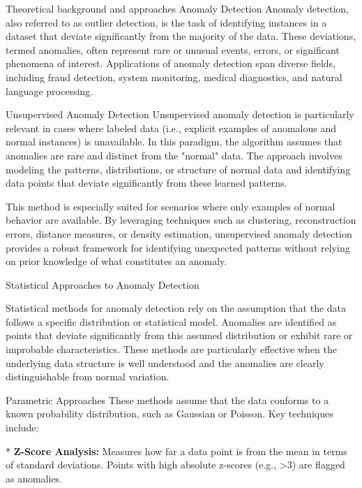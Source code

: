 \chap Theoretical background and approaches
\sec Anomaly Detection
Anomaly detection, also referred to as outlier detection, is the task of identifying instances in a dataset that deviate significantly from the majority of the data. These deviations, termed anomalies, often represent rare or unusual events, errors, or significant phenomena of interest. Applications of anomaly detection span diverse fields, including fraud detection, system monitoring, medical diagnostics, and natural language processing.

\secc Unsupervised Anomaly Detection
Unsupervised anomaly detection is particularly relevant in cases where labeled data (i.e., explicit examples of anomalous and normal instances) is unavailable. In this paradigm, the algorithm assumes that anomalies are rare and distinct from the "normal" data. The approach involves modeling the patterns, distributions, or structure of normal data and identifying data points that deviate significantly from these learned patterns.

This method is especially suited for scenarios where only examples of normal behavior are available. By leveraging techniques such as clustering, reconstruction errors, distance measures, or density estimation, unsupervised anomaly detection provides a robust framework for identifying unexpected patterns without relying on prior knowledge of what constitutes an anomaly.

\sec Statistical Approaches to Anomaly Detection

Statistical methods for anomaly detection rely on the assumption that the data follows a specific distribution or statistical model. Anomalies are identified as points that deviate significantly from this assumed distribution or exhibit rare or improbable characteristics. These methods are particularly effective when the underlying data structure is well understood and the anomalies are clearly distinguishable from normal variation.

\secc Parametric Approaches
These methods assume that the data conforms to a known probability distribution, such as Gaussian or Poisson. Key techniques include:

\begitems
* {\bf Z-Score Analysis:}\nl
Measures how far a data point is from the mean in terms of standard deviations. Points with high absolute z-scores (e.g., >3) are flagged as anomalies.


